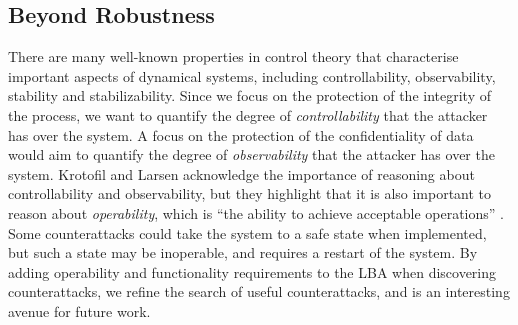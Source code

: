 {{%


\subsection{Beyond Robustness}
There are many well-known properties in control theory that characterise important aspects of dynamical systems, including {controllability, observability, stability} and {stabilizability}. Since we focus on the protection of the integrity of the process, we want to quantify the degree of \emph{controllability} that the attacker has over the system. A focus on the protection of the confidentiality of data would aim to quantify the degree of \emph{observability} that the attacker has over the system. Krotofil and Larsen acknowledge the importance of reasoning about {controllability} and {observability}, but they highlight that it is also important to reason about \emph{operability}, which is ``the ability to achieve acceptable operations'' \cite{krotofil2015rocking}. Some counterattacks could take the system to a safe state when implemented, but such a state may be inoperable, and requires a restart of the system. By adding operability and functionality requirements to the LBA when discovering counterattacks, we refine the search of useful counterattacks, and is an interesting avenue for future work. 
 
}}
